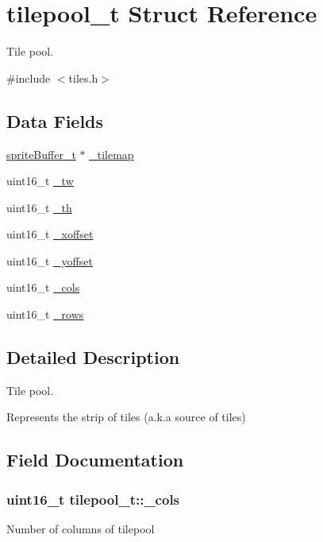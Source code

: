 \hypertarget{structtilepool__t}{}\section{tilepool\+\_\+t Struct Reference}
\label{structtilepool__t}


Tile pool.  




{\ttfamily \#include $<$tiles.\+h$>$}

\subsection*{Data Fields}
\begin{DoxyCompactItemize}
\item 
\hyperlink{structsprite_buffer__t}{sprite\+Buffer\+\_\+t} $\ast$ \hyperlink{structtilepool__t_a2bb67a7343217713e040b5b226b7dd32}{\+\_\+tilemap}
\item 
uint16\+\_\+t \hyperlink{structtilepool__t_af3e69db6b6fc3ea8a1cfbe57a7f03331}{\+\_\+tw}
\item 
uint16\+\_\+t \hyperlink{structtilepool__t_a93705a60174f75c507a2168ddae2f45e}{\+\_\+th}
\item 
uint16\+\_\+t \hyperlink{structtilepool__t_aa13b342aa0f301e0d9b160e17a1e23d8}{\+\_\+xoffset}
\item 
uint16\+\_\+t \hyperlink{structtilepool__t_a3d49b78c34fd815960055061dc4e3086}{\+\_\+yoffset}
\item 
uint16\+\_\+t \hyperlink{structtilepool__t_a8e1d6f20ffda4f4d51ff73e4512a1d64}{\+\_\+cols}
\item 
uint16\+\_\+t \hyperlink{structtilepool__t_afd128c1a685a842642a9d64bf5073abe}{\+\_\+rows}
\end{DoxyCompactItemize}


\subsection{Detailed Description}
Tile pool. 

Represents the strip of tiles (a.\+k.\+a source of tiles) 

\subsection{Field Documentation}
\subsubsection[{\texorpdfstring{\+\_\+cols}{\_cols}}]{\setlength{\rightskip}{0pt plus 5cm}uint16\+\_\+t tilepool\+\_\+t\+::\+\_\+cols}\hypertarget{structtilepool__t_a8e1d6f20ffda4f4d51ff73e4512a1d64}{}\label{structtilepool__t_a8e1d6f20ffda4f4d51ff73e4512a1d64}
Number of columns of tilepool 
